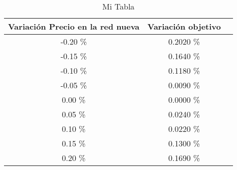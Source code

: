 \begin{table}
\centering
\begin{tabular}{|c|c|c|}
\hline
 Variación Precio en la red nueva & Variación objetivo \\ \hline
-0.20 \% & 0.2020 \% \\ \hline
-0.15 \% & 0.1640 \% \\ \hline
-0.10 \% & 0.1180 \% \\ \hline
-0.05 \% & 0.0090 \% \\ \hline
0.00 \% & 0.0000 \% \\ \hline
0.05 \% & 0.0240 \% \\ \hline
0.10 \% & 0.0220 \% \\ \hline
0.15 \% & 0.1300 \% \\ \hline
0.20 \% & 0.1690 \% \\ \hline
\end{tabular}
\caption{Mi Tabla}
\end{table}
